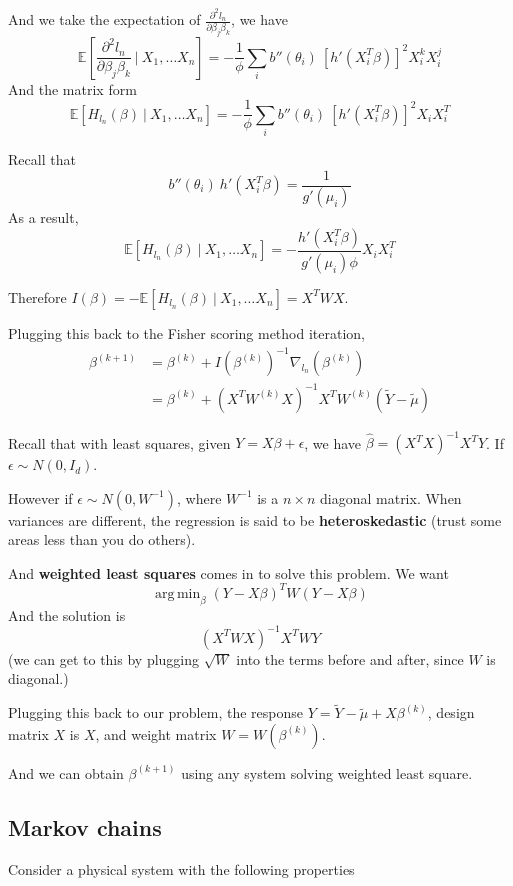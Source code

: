 \documentclass{article}
\DeclareMathOperator*{\argmin}{arg\,min}
\begin{document}
And we take the expectation of $\frac{\partial^2 l_n}{\partial \beta_j \beta_k}$,
we have 
$$
\mathbb{E}[\frac{\partial^2 l_n}{\partial \beta_j \beta_k} ~ | ~ X_1, \dots X_n] = - \frac{1}{\phi} \sum_{i} b''(\theta_i) ~ [h'(X_i^T \beta)]^2 X_i^k X_i^j
$$
And the matrix form
$$
\mathbb{E}[H_{l_n}(\beta) ~ | ~ X_1, \dots X_n] = - \frac{1}{\phi} \sum_{i} b''(\theta_i) ~ [h'(X_i^T \beta)]^2 X_i X_i^T
$$

Recall that
$$
b''(\theta_i) ~ h'(X_i^T \beta) = \frac{1}{g'(\mu_i)}
$$
As a result,
$$
\mathbb{E}[H_{l_n}(\beta) ~ | ~ X_1, \dots X_n] = - \frac{h'(X_i^T \beta)}{g'(\mu_i) \phi} X_i X_i^T
$$

Therefore $I(\beta) = - \mathbb{E}[H_{l_n}(\beta) ~ | ~ X_1, \dots X_n] = X^T W X$.

Plugging this back to the Fisher scoring method iteration,
\begin{align*}
\beta^{(k + 1)} &= \beta^{(k)} + I(\beta^{(k)})^{-1} \nabla_{l_n}(\beta^{(k)}) \\
                &= \beta^{(k)} + (X^T W^(k) X)^{-1} X^T W^{(k)} (\tilde{Y} - \tilde{\mu})
\end{align*}


Recall that with least squares, given $Y = X \beta + \epsilon$, we have $\hat{\beta} = (X^T X)^{-1} X^T Y$.
If $\epsilon \sim \mathit{N}(0, I_d)$.

However if $\epsilon \sim \mathit{N}(0, W^{-1})$, where $W^{-1}$ is a $n \times n$ diagonal matrix.
When variances are different, the regression is said to be \textbf{heteroskedastic} (trust some areas less than you do others).

And \textbf{weighted least squares} comes in to solve this problem.
We want
$$
\argmin_{\beta}(Y - X \beta)^T W (Y - X \beta)
$$
And the solution is
$$
(X^T W X)^{-1} X^T W Y
$$
(we can get to this by plugging $\sqrt{W}$ into the terms before and after, since $W$ is diagonal.)

Plugging this back to our problem, the response $Y = \tilde{Y} - \tilde{\mu} + X \beta^{(k)}$,
design matrix $X$ is $X$,
and weight matrix $W = W(\beta^{(k)})$.

And we can obtain $\beta^{(k + 1)}$ using any system solving weighted least square.

\subsection{Markov chains}

Consider a physical system with the following properties
\end{document}
